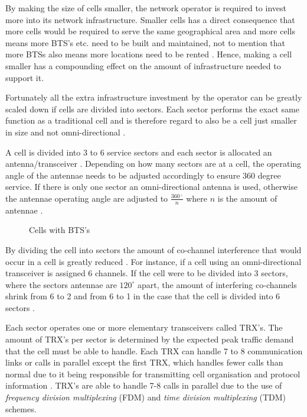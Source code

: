 By making the size of cells smaller, the network operator is required to invest more into its network infrastructure. Smaller cells has a direct consequence that more cells would be required to serve the same geographical area and more cells means more BTS's etc. need to be built and maintained, not to mention that more BTSs also means more locations need to be rented \cite{GSMArchitectureProtocolsServices}. Hence, making a cell smaller has a compounding effect on the amount of infrastructure needed to support it.

Fortunately all the extra infrastructure investment by the operator can be greatly scaled down if cells are divided into sectors\label{def:cellsector}. Each sector performs the exact same function as a traditional cell and is therefore regard to also be a cell just smaller in size and not omni-directional \cite{GSMArchitectureProtocolsServices,GSM92,GSMSysEngin}. 

A cell is divided into 3 to 6 service sectors and each sector is allocated an antenna/transceiver \cite{GSMSysEngin}. Depending on how many sectors are at a cell, the operating angle of the antennae needs to be adjusted accordingly to ensure 360 degree service. If there is only one sector an omni-directional antenna is used, otherwise the antennae operating angle are adjusted to $\frac{360\,^{\circ}}{n}$ where ${n}$ is the amount of antennae \cite{Eisenblatter}.
\begin{figure}[h]
	\begin{centering}
		
		\caption{Cells with BTS's}
		\label{fig:GSMCell}
	\end{centering}
\end{figure}

By dividing the cell into sectors the amount of co-channel interference that would occur in a cell is greatly reduced \cite{GSMArchitectureProtocolsServices}. For instance, if a cell using an omni-directional transceiver is assigned 6 channels. If the cell were to be divided into 3 sectors, where the sectors antennae are $120^\circ$ apart, the amount of interfering co-channels shrink from 6 to 2 and from 6 to 1 in the case that the cell is divided into 6 sectors \cite{GSMSysEngin,GSM92,GSMArchitectureProtocolsServices}.

Each sector operates one or more elementary transceivers called TRX’s. The amount of TRX’s per sector is determined by the expected peak traffic demand that the cell must be able to handle. Each TRX can handle 7 to 8 communication links or calls in parallel except the first TRX, which handles fewer calls than normal due to it being responsible for transmitting cell organisation and protocol information \cite{Eisenblatter}. TRX’s are able to handle 7-8 calls in parallel due to the use of \emph{frequency division multiplexing} (FDM) and \emph{time division multiplexing} (TDM) schemes. 

